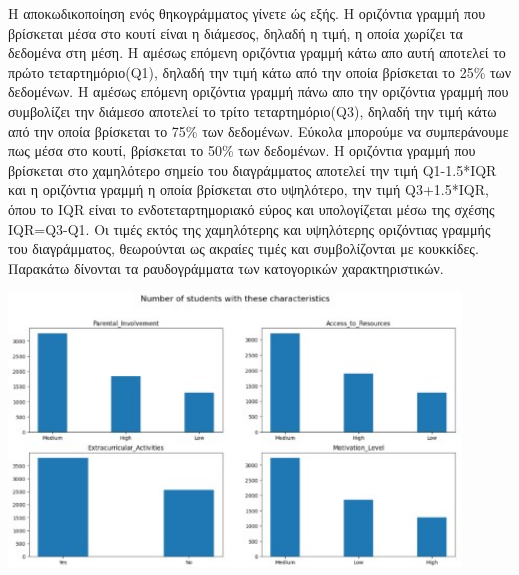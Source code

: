 \documentclass[12pt]{article}
\begin{document}
Η αποκωδικοποίηση ενός θηκογράμματος γίνετε ώς εξής. Η οριζόντια γραμμή που βρίσκεται μέσα στο κουτί είναι η διάμεσος, δηλαδή η τιμή, η οποία χωρίζει τα δεδομένα στη μέση. Η αμέσως επόμενη οριζόντια γραμμή κάτω απο αυτή αποτελεί το πρώτο τεταρτημόριο(Q1), δηλαδή την τιμή κάτω από την οποία βρίσκεται το 25\% των δεδομένων. Η αμέσως επόμενη οριζόντια γραμμή πάνω απο την οριζόντια γραμμή που συμβολίζει την διάμεσο αποτελεί το τρίτο τεταρτημόριο(Q3), δηλαδή την τιμή κάτω από την οποία βρίσκεται το 75\% των δεδομένων. Εύκολα μπορούμε να συμπεράνουμε πως μέσα στο κουτί, βρίσκεται το 50\% των δεδομένων. Η οριζόντια γραμμή που βρίσκεται στο χαμηλότερο σημείο του διαγράμματος αποτελεί την τιμή Q1-1.5*IQR και η οριζόντια γραμμή η οποία βρίσκεται στο υψηλότερο, την τιμή Q3+1.5*IQR, όπου το IQR είναι το ενδοτεταρτημοριακό εύρος και υπολογίζεται μέσω της σχέσης IQR=Q3-Q1. Οι τιμές εκτός της χαμηλότερης και υψηλότερης οριζόντιας γραμμής του διαγράμματος, θεωρούνται ως ακραίες τιμές και συμβολίζονται με κουκκίδες.\\

\noindent Παρακάτω δίνονται τα ραυδογράμματα των κατογορικών χαρακτηριστικών.

\begin{center}
    \includegraphics[width=0.9\textwidth]{./images/icon14.jpg}
    
\end{center}
\end{document}
